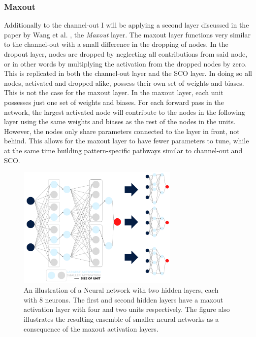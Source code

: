 \subsubsection*{Maxout}\label{subsubsec:maxout} 
Additionally to the channel-out I will be applying a second layer discussed in the paper by Wang et al. \cite{wang_maxout_2013}, 
the \emph{Maxout} layer. The maxout layer functions very similar to the channel-out with a small difference in the dropping of nodes. 
In the dropout layer, nodes are dropped by neglecting all contributions from said node, or in other words by multiplying the activation 
from the dropped nodes by zero. This is replicated in both the channel-out layer and the \ac{SCO} layer. In doing so all nodes, activated 
and dropped alike, possess their own set of weights and biases. This is not the case for the maxout layer.
In the maxout layer, each unit possesses just one set of weights and biases. For each forward pass in the network, the largest activated 
node will contribute to the nodes in the following layer using the same weights and biases as the rest of the nodes in the units. However, 
the nodes only share parameters connected to the layer in front, not behind. This allows for the maxout layer to have fewer parameters to 
tune, while at the same time building pattern-specific pathways similar to channel-out and \ac{SCO}. \\
\begin{figure}
    \centering
    \includegraphics[width=0.7\textwidth]{Figures/Illustrations/Max_out.png}
    \caption[An illustration of a Neural network with two hidden layers using the maxout layer.]{An illustration of a Neural network 
    with two hidden layers, each with 8 neurons. The first and second hidden layers have a maxout activation layer with four and two 
    units respectively. The figure also illustrates the resulting ensemble of smaller neural networks as a consequence
    of the maxout activation layers. }
    \label{fig:Max_out}
\end{figure}
